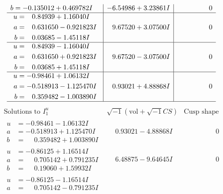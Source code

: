 \documentclass[1p]{elsarticle_modified}
\theoremstyle{definition}
\newcommand{\I}{\sqrt{-1}}
\begin{document}
$$\begin{array}{c|c|c}
\begin{aligned}
b &= -0.135012 + 0.469782 I\end{aligned}
 & -6.54986 + 3.23861 I & \phantom{-0.000000 } 0 \\ \hline\begin{aligned}
u &= \phantom{-}0.84939 + 1.16040 I \\
a &= \phantom{-}0.631650 - 0.921823 I \\
b &= \phantom{-}0.03685 - 1.45118 I\end{aligned}
 & \phantom{-}9.67520 + 3.07500 I & \phantom{-0.000000 } 0 \\ \hline\begin{aligned}
u &= \phantom{-}0.84939 - 1.16040 I \\
a &= \phantom{-}0.631650 + 0.921823 I \\
b &= \phantom{-}0.03685 + 1.45118 I\end{aligned}
 & \phantom{-}9.67520 - 3.07500 I & \phantom{-0.000000 } 0 \\ \hline\begin{aligned}
u &= -0.98461 + 1.06132 I \\
a &= -0.518913 - 1.125470 I \\
b &= \phantom{-}0.359482 - 1.003890 I\end{aligned}
 & \phantom{-}0.93021 + 4.88868 I & \phantom{-0.000000 } 0\\
 \hline 
 \end{array}$$\newpage$$\begin{array}{c|c|c}  
\text{Solutions to }I^u_{1}& \I (\text{vol} + \sqrt{-1}CS) & \text{Cusp shape}\\
 \hline 
\begin{aligned}
u &= -0.98461 - 1.06132 I \\
a &= -0.518913 + 1.125470 I \\
b &= \phantom{-}0.359482 + 1.003890 I\end{aligned}
 & \phantom{-}0.93021 - 4.88868 I & \phantom{-0.000000 } 0 \\ \hline\begin{aligned}
u &= -0.86125 + 1.16514 I \\
a &= \phantom{-}0.705142 + 0.791235 I \\
b &= \phantom{-}0.19060 + 1.59932 I\end{aligned}
 & \phantom{-}6.48875 - 9.64645 I & \phantom{-0.000000 } 0 \\ \hline\begin{aligned}
u &= -0.86125 - 1.16514 I \\
a &= \phantom{-}0.705142 - 0.791235 I \\

\end{aligned}
\end{array}$$
\end{document}
